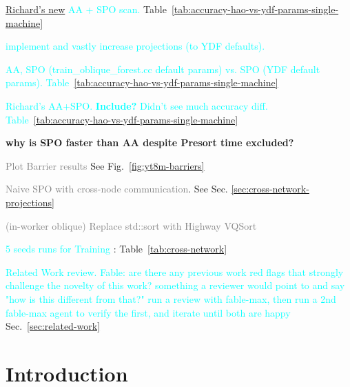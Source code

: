 \documentclass[sigconf,screen]{acmart}
\newcommand{\done}{\rlap{$\square$}{\raisebox{2pt}{\large\hspace{1pt}\checkmark}}\hspace{-2.5pt}}
\newcommand{\Claude}[1]{\textbf{\textcolor{YellowOrange}{#1}}}
\begin{document}
\begin{todolist}
    \item[\textcolor{cyan}{\done}] \textcolor{cyan}{\href{https://github.com/google/yggdrasil-decision-forests/commit/2fe3a7fae5a3e8646401cd98f5c0a2a9d5d81653}{Richard's new} AA + SPO scan.} Table~\ref{tab:accuracy-hao-vs-ydf-params-single-machine}
    \begin{todolist}
        \item[\textcolor{cyan}{\done}] \textcolor{cyan}{implement and vastly increase projections (to YDF defaults).}
        \item[\textcolor{cyan}{\done}] \textcolor{cyan}{AA, SPO (train\_oblique\_forest.cc default params) vs. SPO (YDF default params). Table~\ref{tab:accuracy-hao-vs-ydf-params-single-machine}}
        \item[\textcolor{cyan}{\done}] \textcolor{cyan}{Richard's AA+SPO. \textbf{Include?} Didn't see much accuracy diff. Table~\ref{tab:accuracy-hao-vs-ydf-params-single-machine}}
    \end{todolist}
    \item \Claude{why is SPO faster than AA despite Presort time excluded?} %
    \item[\textcolor{gray}{\done}] \textcolor{gray}{Plot Barrier results} See Fig.~\ref{fig:yt8m-barriers}
    \begin{todolist}
        \item[\textcolor{gray}{\done}] \textcolor{gray}{Naive SPO with cross-node communication}. See Sec. \ref{sec:cross-network-projections}
    \end{todolist}
    \item[\textcolor{gray}{\done}] \textcolor{gray}{(in-worker oblique) Replace std::sort with Highway VQSort}
    \item[\textcolor{cyan}{\done}] \textcolor{cyan}{5 seeds runs for Training} : Table~\ref{tab:cross-network}
    \item[\textcolor{cyan}{\done}] \textcolor{cyan}{Related Work review. Fable: are there any previous work red flags that strongly challenge the novelty of this work? something a reviewer would point to and say "how is this different from that?" run a review with fable-max, then run a 2nd fable-max agent to verify the first, and iterate until both are happy} Sec.~\ref{sec:related-work}
\end{todolist}


\section{Introduction}
\end{document}
